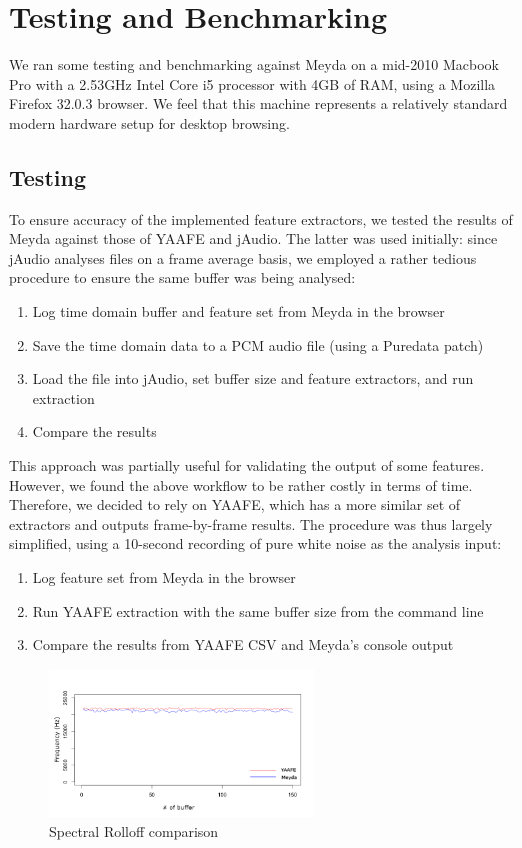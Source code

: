 \documentclass{sig-alternate}
\begin{document}
\section{Testing and Benchmarking}
We ran some testing and benchmarking against Meyda on a mid-2010 Macbook Pro with a 2.53GHz Intel Core i5 processor with 4GB of RAM, using a Mozilla Firefox 32.0.3 browser. We feel that this machine represents a relatively standard modern hardware setup for desktop browsing.
\subsection{Testing}
To ensure accuracy of the implemented feature extractors, we tested the results of Meyda against those of YAAFE and jAudio. The latter was used initially: since jAudio analyses files on a frame average basis, we employed a rather tedious procedure to ensure the same buffer was being analysed:

\begin{enumerate}
	\item{Log time domain buffer and feature set from Meyda in the browser}
	\item{Save the time domain data to a PCM audio file (using a Puredata patch)}
	\item{Load the file into jAudio, set buffer size and feature extractors, and run extraction}
	\item{Compare the results}
\end{enumerate}

This approach was partially useful for validating the output of some features. However, we found the above workflow to be rather costly in terms of time. Therefore, we decided to rely on YAAFE, which has a more similar set of extractors and outputs frame-by-frame results. The procedure was thus largely simplified, using a 10-second recording of pure white noise as the analysis input:

\begin{enumerate}
	\item{Log feature set from Meyda in the browser}
	\item{Run YAAFE extraction with the same buffer size from the command line}
    \item{Compare the results from YAAFE CSV and Meyda's console output}
\end{enumerate}

\begin{figure}[ht!]
\centering
\includegraphics[width=70mm]{SR.png}
\caption{Spectral Rolloff comparison}
\label{fig:rolloff}
\end{figure}
\end{document}
